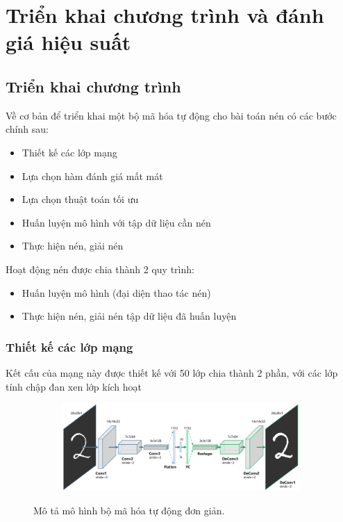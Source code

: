 \chapter{Triển khai chương trình và đánh giá hiệu suất}
\label{cha:chap3}

\section{Triển khai chương trình}
Về cơ bản để triển khai một bộ mã hóa tự động cho bài toán nén
có các bước chính sau:
\begin{itemize}[leftmargin=1.5cm]
    \item Thiết kế các lớp mạng
    \item Lựa chọn hàm đánh giá mất mát
    \item Lựa chọn thuật toán tối ưu
    \item Huấn luyện mô hình với tập dữ liệu cần nén
    \item Thực hiện nén, giải nén
\end{itemize}

Hoạt động nén được chia thành 2 quy trình:
\begin{itemize}[leftmargin=1.5cm]
    \item Huấn luyện mô hình (đại diện thao tác nén)
    \item Thực hiện nén, giải nén tập dữ liệu đã huấn luyện
\end{itemize}

\subsection{Thiết kế các lớp mạng}

Kết cấu của mạng này được thiết kế với 50 lớp chia thành 2 phần,
với các lớp tính chập đan xen lớp kích hoạt

\begin{figure}
    \begin{subfigure}{0.8\textwidth}
        \includegraphics[width=1.\linewidth]{Chapters/items/networks.jpg}
        \caption{}
        \label{fig: net1}
    \end{subfigure}
    \caption{Mô tả mô hình bộ mã hóa tự động đơn giản.}
\end{figure}

